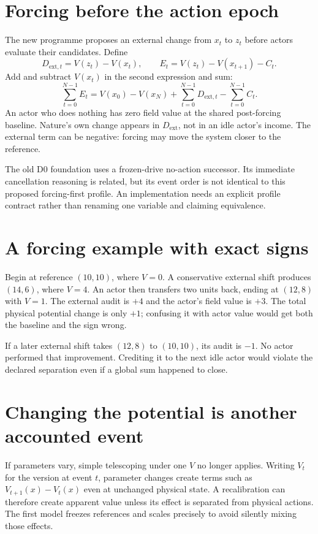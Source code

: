 \section{Forcing before the action epoch}
The new programme proposes an external change from $x_t$ to $z_t$ before
actors evaluate their candidates. Define
\begin{equation}
 D_{\mathrm{ext},t}=V(z_t)-V(x_t),\qquad
 E_t=V(z_t)-V(x_{t+1})-C_t.
\end{equation}
Add and subtract $V(x_t)$ in the second expression and sum:
\begin{equation}\label{eq:driven}
 \sum_{t=0}^{N-1}E_t
 =V(x_0)-V(x_N)+\sum_{t=0}^{N-1}D_{\mathrm{ext},t}
                  -\sum_{t=0}^{N-1}C_t.
\end{equation}
An actor who does nothing has zero field value at the shared post-forcing
baseline. Nature's own change appears in $D_{\mathrm{ext}}$, not in an
idle actor's income. The external term can be negative: forcing may move
the system closer to the reference.

The old D0 foundation uses a frozen-drive no-action successor. Its immediate
cancellation reasoning is related, but its event order is not identical to
this proposed forcing-first profile. An implementation needs an explicit
profile contract rather than renaming one variable and claiming equivalence.

\section{A forcing example with exact signs}
Begin at reference $(10,10)$, where $V=0$. A conservative external shift
produces $(14,6)$, where $V=4$. An actor then transfers two units back,
ending at $(12,8)$ with $V=1$. The external audit is $+4$ and the actor's
field value is $+3$. The total physical potential change is only $+1$;
confusing it with actor value would get both the baseline and the sign wrong.

If a later external shift takes $(12,8)$ to $(10,10)$, its audit is $-1$.
No actor performed that improvement. Crediting it to the next idle actor
would violate the declared separation even if a global sum happened to close.

\section{Changing the potential is another accounted event}
If parameters vary, simple telescoping under one $V$ no longer applies.
Writing $V_t$ for the version at event $t$, parameter changes create terms
such as $V_{t+1}(x)-V_t(x)$ even at unchanged physical state. A recalibration
can therefore create apparent value unless its effect is separated from
physical actions. The first model freezes references and scales precisely
to avoid silently mixing those effects.

